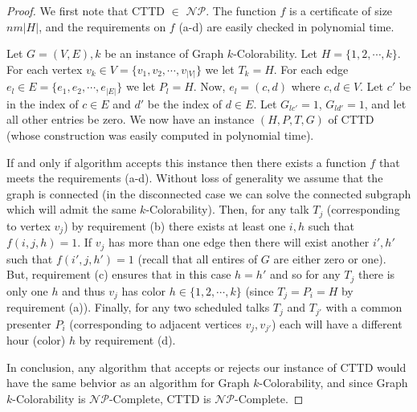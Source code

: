 \documentclass[]{article}
\theoremstyle{definition}
\theoremstyle{remark}
\numberwithin{equation}{section}
\newcommand{\cNP}{$\mathcal{NP}$}
\begin{document}
\begin{proof}\label{cttd_np}
	We first note that CTTD $\in$ \cNP. The function $f$ is a certificate of size $nm|H|$, and the requirements on $f$ (a-d) are easily checked in polynomial time.
	
	Let $G=(V,E),k$ be an instance of Graph $k$-Colorability. Let $H=\{1, 2, \cdots, k\}$. For each vertex $v_k \in V=\{v_1, v_2, \cdots, v_{|V|}\}$ we let $T_k = H$. For each edge $e_l \in E=\{e_1, e_2, \cdots, e_{|E|}\}$ we let $P_l = H$. Now, $e_l = (c,d)$ where $c,d \in V$. Let $c'$ be in the index of $c \in E$ and $d'$ be the index of $d \in E$. Let $G_{lc'} = 1$, $G_{ld'} = 1$, and let all other entries be zero. We now have an instance $(H, P, T, G)$ of CTTD (whose construction was easily computed in polynomial time). 
	
	If and only if algorithm accepts this instance then there exists a function $f$ that meets the requirements (a-d). Without loss of generality we assume that the graph is connected (in the disconnected case we can solve the connected subgraph which will admit the same $k$-Colorability). Then, for any talk $T_j$ (corresponding to vertex $v_j$)  by requirement (b) there exists at least one $i, h$ such that $f(i,j,h) = 1$. If $v_j$ has more than one edge then there will exist another $i',h'$ such that $f(i',j,h')=1$ (recall that all entires of $G$ are either zero or one). But, requirement (c) ensures that in this case $h=h'$ and so for any $T_j$ there is only one $h$ and thus $v_j$ has color $h \in \{1,2,\cdots,k\}$ (since $T_j=P_i=H$ by requirement (a)). Finally, for any two scheduled talks $T_j$ and $T_{j'}$ with a common presenter $P_i$ (corresponding to adjacent vertices $v_j, v_{j'}$) each will have a different hour (color) $h$ by requirement (d).
	
	In conclusion, any algorithm that accepts or rejects our instance of CTTD would have the same behvior as an algorithm for Graph $k$-Colorability, and since Graph $k$-Colorability is \cNP-Complete, CTTD is \cNP-Complete.
\end{proof}
\end{document}
